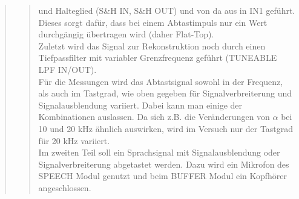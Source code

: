 \begin{quote}
\begin{quote}
     und Halteglied (S\&H IN, S\&H OUT) und von da aus in IN1 geführt. Dieses sorgt dafür, dass bei einem Abtastimpuls
     nur ein Wert durchgängig übertragen wird (daher Flat-Top).\\
     \noindent\hspace*{4mm}
     Zuletzt wird das Signal zur Rekonstruktion noch durch einen Tiefpassfilter mit variabler Grenzfrequenz geführt
     (TUNEABLE LPF IN/OUT).\\
     \noindent\hspace*{4mm}
     Für die Messungen wird das Abtastsignal sowohl in der Frequenz, als auch im Tastgrad, wie oben gegeben für
     Signalverbreiterung und Signalausblendung variiert.
     Dabei kann man einige der Kombinationen auslassen. Da sich z.B. die Veränderungen von $\alpha$ bei 10 und 20 kHz
     ähnlich auswirken, wird im Versuch nur der Tastgrad für 20 kHz variiert.\\
     \noindent\hspace*{4mm}
     Im zweiten Teil soll ein Sprachsignal mit Signalausblendung oder Signalverbreiterung abgetastet werden. Dazu wird
     ein Mikrofon des SPEECH Modul genutzt und beim BUFFER Modul ein Kopfhörer angeschlossen.
    \end{quote}
    
\end{quote}


